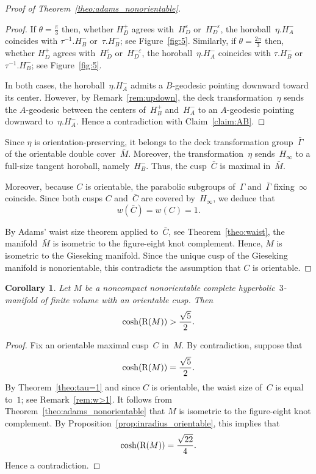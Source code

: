 \documentclass[11pt,reqno]{amsart}
\newtheorem{corollary}[theorem]{Corollary}
\theoremstyle{definition}
\numberwithin{equation}{section}
\newcommand\RR{{\rm R}}
\numberwithin{equation}{section}
\begin{document}
\begin{proof}[Proof of Theorem~\ref{theo:adams_nonorientable}]
\begin{proof}
If $\theta=\frac{\pi}{3}$ then, whether $H_D^+$ agrees with~$H_D^\varepsilon$ or~$H_D^{-\varepsilon}$, the horoball~$\eta.H_A^-$ coincides with $\tau^{-1}.H_B^-$ or~$\tau.H_B^-$; see Figure~\ref{fig:5}.
Similarly, if $\theta=\frac{2\pi}{3}$ then, whether $H_D^+$ agrees with~$H_D^\varepsilon$ or~$H_D^{-\varepsilon}$, the horoball~$\eta.H_A^-$ coincides with $\tau.H_B^-$ or~$\tau^{-1}.H_B^-$; see Figure~\ref{fig:5}.

In both cases, the horoball~$\eta.H_A^-$ admits a $B$-geodesic pointing downward toward its center.
However, by Remark~\ref{rem:updown}, the deck transformation~$\eta$ sends the $A$-geodesic between the centers of~$H_B^+$ and~$H_A^-$ to an  $A$-geodesic pointing downward to~$\eta.H_A^-$.
Hence a contradiction with Claim~\ref{claim:AB}.
\end{proof}

Since $\eta$ is orientation-preserving, it belongs to the deck transformation group~$\bar{\Gamma}$ of the orientable double cover~$\bar{M}$.
Moreover, the transformation~$\eta$ sends~$H_\infty$ to a full-size tangent horoball, namely~$H_B^-$.
Thus, the  cusp~$\bar{C}$ is maximal in~$\bar{M}$.

Moreover, because $C$ is orientable, the parabolic subgroups of~$\Gamma$ and~$\bar{\Gamma}$ fixing~$\infty$ coincide.
Since both cusps $C$ and~$\bar{C}$ are covered by~$H_\infty$, we deduce that 
\[
w(\bar{C})=w(C)=1.
\]

By Adams' waist size theorem applied to~$\bar{C}$, see Theorem~\ref{theo:waist}, the manifold~$\bar{M}$ is isometric to the figure-eight knot complement.
Hence, $M$ is isometric to the Gieseking manifold.
Since the unique cusp of the Gieseking manifold is nonorientable, this contradicts the assumption that $C$ is orientable.
\end{proof}


\forget

\begin{corollary}
Let $M$ be a noncompact nonorientable complete hyperbolic~$3$-manifold of finite volume with an orientable cusp.
Then
\[
\cosh(\RR(M))  > \frac{\sqrt{5}}{2}.
\]
\end{corollary}

\begin{proof}
Fix an orientable maximal cusp~$C$ in~$M$.
By contradiction, suppose that 
\[
\cosh(\RR(M))  = \frac{\sqrt{5}}{2}.
\]
By Theorem~\ref{theo:tau=1} and since $C$ is orientable, the waist size of~$C$ is equal to~$1$; see Remark~\ref{rem:w>1}.
It follows from Theorem~\ref{theo:adams_nonorientable} that $M$ is isometric to the figure-eight knot complement.
By Proposition~\ref{prop:inradius_orientable}, this implies that
\[
\cosh(\RR(M)) = \frac{\sqrt{22}}{4}.
\]
Hence a contradiction.
\end{proof}
\end{document}
